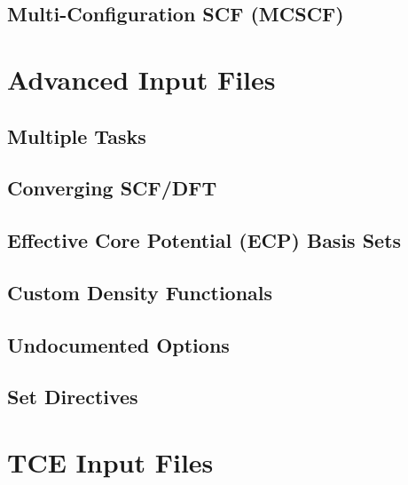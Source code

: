 \documentclass[letterpaper,12pt]{article}
\begin{document}
\newpage

\subsection{Multi-Configuration SCF (MCSCF)}\label{sec:MultiConfigurationSCF}

\newpage

\section{Advanced Input Files}\label{sec:AdvancedInputFiles}

\newpage

\subsection{Multiple Tasks}\label{sec:MultipleTasks}

\newpage

\subsection{Converging SCF/DFT}\label{sec:ConvergingSCF}

\newpage

\subsection{Effective Core Potential (ECP) Basis Sets}\label{sec:ECPBasisSets}

\newpage

\subsection{Custom Density Functionals}\label{sec:CustomDensityFunctionals}

\newpage

\subsection{Undocumented Options}\label{sec:UndocumentedOptions}

\newpage

\subsection{Set Directives}\label{sec:SetDirectives}

\newpage

\section{TCE Input Files}\label{sec:TCEInputFiles}

\newpage
\end{document}
